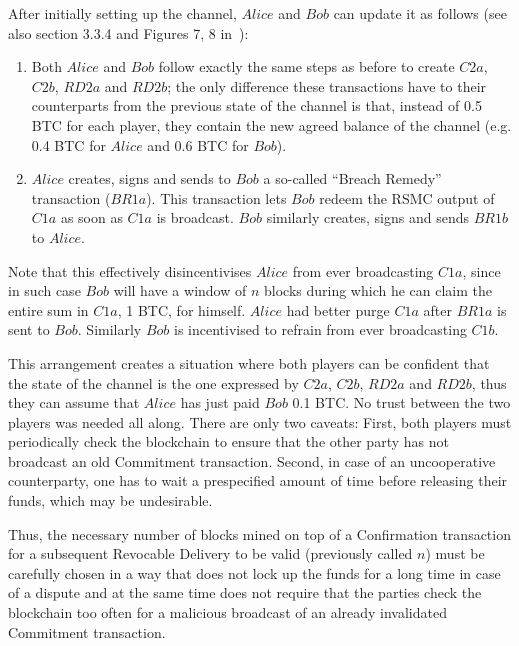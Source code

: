     After initially setting up the channel, $Alice$ and $Bob$ can update it as follows
    (see also section 3.3.4 and Figures 7, 8 in~\cite{lightning}):
    \begin{enumerate}
      \item Both $Alice$ and $Bob$ follow exactly the same steps as before to create
      $C2a$, $C2b$, $RD2a$ and $RD2b$; the only difference these transactions have to
      their counterparts from the previous state of the channel is that, instead of 0.5
      BTC for each player, they contain the new agreed balance of the channel (e.g. 0.4
      BTC for $Alice$ and 0.6 BTC for $Bob$).

      \item $Alice$ creates, signs and sends to $Bob$ a so-called ``Breach Remedy''
      transaction ($BR1a$). This transaction lets $Bob$ redeem the RSMC output of $C1a$ as
      soon as $C1a$ is broadcast. $Bob$ similarly creates, signs and sends $BR1b$ to
      $Alice$.
    \end{enumerate}
    Note that this effectively disincentivises $Alice$ from ever broadcasting $C1a$, since
    in such case $Bob$ will have a window of $n$ blocks during which he can claim the
    entire sum in $C1a$, 1 BTC, for himself. $Alice$ had better purge $C1a$ after $BR1a$
    is sent to $Bob$. Similarly $Bob$ is incentivised to refrain from ever broadcasting
    $C1b$.

    This arrangement creates a situation where both players can be confident that the
    state of the channel is the one expressed by $C2a$, $C2b$, $RD2a$ and $RD2b$, thus
    they can assume that $Alice$ has just paid $Bob$ 0.1 BTC. No trust between the two
    players was needed all along. There are only two caveats: First, both players must
    periodically check the blockchain to ensure that the other party has not broadcast an
    old Commitment transaction. Second, in case of an uncooperative counterparty, one has
    to wait a prespecified amount of time before releasing their funds, which may be
    undesirable.

    Thus, the necessary number of blocks mined on top of a Confirmation transaction for a
    subsequent Revocable Delivery to be valid (previously called $n$) must be carefully
    chosen in a way that does not lock up the funds for a long time in case of a dispute
    and at the same time does not require that the parties check the blockchain too often
    for a malicious broadcast of an already invalidated Commitment transaction.

